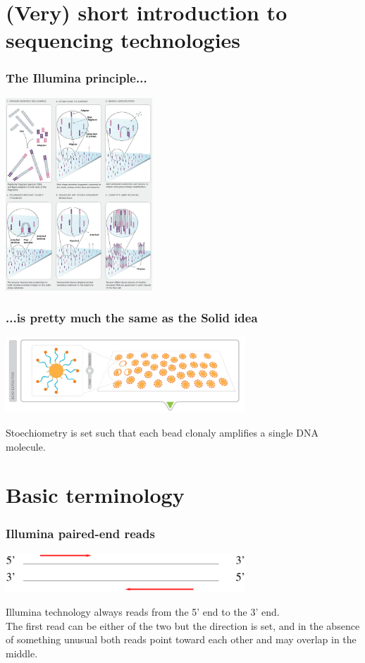 \documentclass{beamer}
\begin{document}

\section{(Very) short introduction to sequencing technologies}


\begin{frame}
  \frametitle{The Illumina principle...}
  \begin{center}
    \includegraphics[width=5.5cm]{fig/illumina_workflow.jpg}
  \end{center}
\end{frame}

\begin{frame}
  \frametitle{...is pretty much the same as the Solid idea}
  \begin{center}
    \includegraphics[width=9cm]{fig/solid3.jpg}
  \end{center}
  Stoechiometry is set such that each bead clonaly amplifies a single DNA molecule.
\end{frame}



\section{Basic terminology}


\begin{frame}
  \frametitle{Illumina paired-end reads}
  \begin{center}
    \includegraphics[width=9cm]{fig/illumina_reads_basic.pdf}
  \end{center}
  Illumina technology always reads from the 5' end to the 3' end.\\
  The first read can be either of the two but the direction is set, and in the absence of something unusual both reads point toward each other and may overlap in the middle.
\end{frame}
\end{document}
